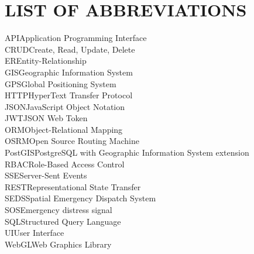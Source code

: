 \chapter*{LIST OF ABBREVIATIONS}

API\tabto{8em}Application Programming Interface \\
CRUD\tabto{8em}Create, Read, Update, Delete \\
ER\tabto{8em}Entity-Relationship \\
GIS\tabto{8em}Geographic Information System \\
GPS\tabto{8em}Global Positioning System \\
HTTP\tabto{8em}HyperText Transfer Protocol \\
JSON\tabto{8em}JavaScript Object Notation \\
JWT\tabto{8em}JSON Web Token \\
ORM\tabto{8em}Object-Relational Mapping \\
OSRM\tabto{8em}Open Source Routing Machine \\
PostGIS\tabto{8em}PostgreSQL with Geographic Information System extension \\
RBAC\tabto{8em}Role-Based Access Control \\
SSE\tabto{8em}Server-Sent Events \\
REST\tabto{8em}Representational State Transfer \\
SEDS\tabto{8em}Spatial Emergency Dispatch System \\
SOS\tabto{8em}Emergency distress signal \\
SQL\tabto{8em}Structured Query Language \\
UI\tabto{8em}User Interface \\
WebGL\tabto{8em}Web Graphics Library \\
